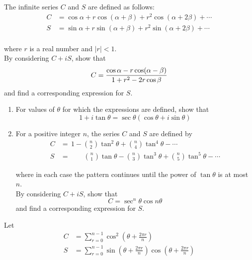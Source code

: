 \documentclass[leqno]{article}
\begin{document}
\begin{enumerate}[
  label=\textbf{\arabic*.},
  leftmargin=*,
  topsep=0pt,
  partopsep=0pt,
  parsep=0pt
]
The infinite series $C$ and $S$ are defined as follows: \\
\begin{align*}
C&= \cos\alpha + r\cos(\alpha + \beta) + r^2\cos(\alpha + 2\beta) + \cdots \\[10pt]
S &= \sin\alpha + r\sin(\alpha + \beta) + r^2\sin(\alpha + 2\beta) + \cdots \\
\end{align*}

where $r$ is a real number and $|r| < 1$. \\


By considering $C+ iS$, show that \\
\[
C= \frac{\cos\alpha - r\cos(\alpha - \beta)}{1 + r^2 - 2r\cos\beta} \\
\] 
and find a corresponding expression for $S$. 

\newpage

\questionitem

\begin{enumerate}[label=\textbf{(\roman*)}]
  \item For values of $\theta$ for which the expressions are defined, show that
  \[
  1+i\tan\theta=\sec\theta(\cos\theta+i\sin\theta)
  \]

  \item For a positive integer $n$, the series $C$ and $S$ are defined by
  \begin{align*}
    C&=\,1-\binom{n}{2}\tan^2\theta+\binom{n}{4}\tan^4\theta-\cdots\\[10pt]
  S&=\qquad\binom{n}{1}\tan\theta-\binom{n}{3}\tan^3\theta+\binom{n}{5}\tan^5\theta-\cdots
  \end{align*}

  where in each case the pattern continues until the power of $\tan\theta$ is at most $n$. \\

  By considering $C+iS$, show that
  \[
  C=\sec^n\theta\cos n\theta
  \]
  and find a corresponding expression for $S$. 
\end{enumerate}

\newpage

\questionitem

Let
\begin{align*}
C&= \sum_{r=0}^{n-1}\cos^2\left(\theta + \frac{2\pi r}{n}\right)\\[10pt]
S &= \sum_{r=0}^{n-1}\sin\left(\theta + \frac{2\pi r}{n}\right)\cos\left(\theta + \frac{2\pi r}{n}\right)\\
\end{align*}


\end{enumerate}
\end{document}
